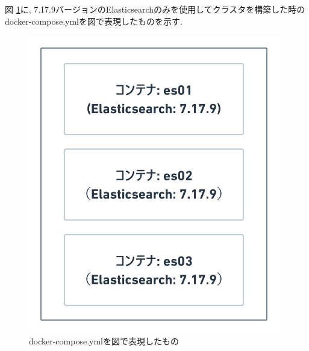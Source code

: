 図 \ref{4-p3}に, 7.17.9バージョンのElasticsearchのみを使用してクラスタを構築した時のdocker-compose.ymlを図で表現したものを示す.

\begin{figure}[H]
  \begin{center}
    \includegraphics[width=110mm]{sotu/figure/all-7.19.9.png}
    \caption{docker-compose.ymlを図で表現したもの}
    \label{4-p3}
  \end{center}
\end{figure}




